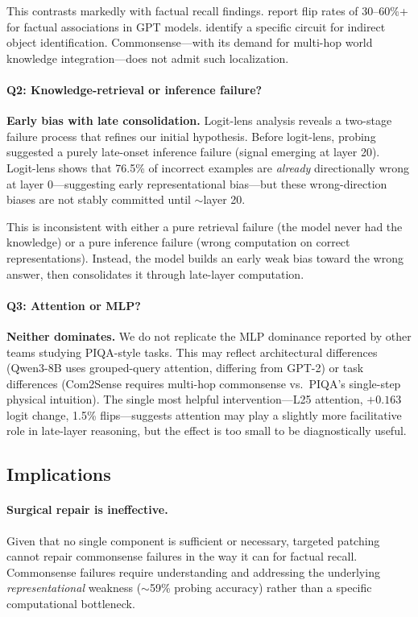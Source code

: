 \documentclass{article}
\begin{document}
This contrasts markedly with factual recall findings. \citet{geva2023dissecting} report flip rates of 30--60\%+ for factual associations in GPT models. \citet{wang2022interpretability} identify a specific circuit for indirect object identification. Commonsense—with its demand for multi-hop world knowledge integration—does not admit such localization.

\paragraph{Q2: Knowledge-retrieval or inference failure?}
\textbf{Early bias with late consolidation.} Logit-lens analysis reveals a two-stage failure process that refines our initial hypothesis. Before logit-lens, probing suggested a purely late-onset inference failure (signal emerging at layer 20). Logit-lens shows that 76.5\% of incorrect examples are \emph{already} directionally wrong at layer 0—suggesting early representational bias—but these wrong-direction biases are not stably committed until $\sim$layer 20.

This is inconsistent with either a pure retrieval failure (the model never had the knowledge) or a pure inference failure (wrong computation on correct representations). Instead, the model builds an early weak bias toward the wrong answer, then consolidates it through late-layer computation.

\paragraph{Q3: Attention or MLP?}
\textbf{Neither dominates.} We do not replicate the MLP dominance reported by other teams studying PIQA-style tasks. This may reflect architectural differences (Qwen3-8B uses grouped-query attention, differing from GPT-2) or task differences (Com2Sense requires multi-hop commonsense vs.\ PIQA's single-step physical intuition). The single most helpful intervention—L25 attention, $+0.163$ logit change, 1.5\% flips—suggests attention may play a slightly more facilitative role in late-layer reasoning, but the effect is too small to be diagnostically useful.

\subsection{Implications}

\paragraph{Surgical repair is ineffective.}
Given that no single component is sufficient or necessary, targeted patching cannot repair commonsense failures in the way it can for factual recall. Commonsense failures require understanding and addressing the underlying \emph{representational} weakness ($\sim$59\% probing accuracy) rather than a specific computational bottleneck.
\end{document}
